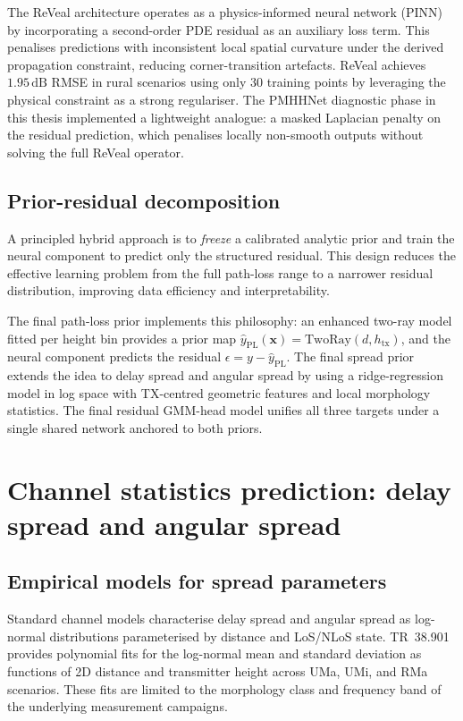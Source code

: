 The ReVeal architecture \cite{reveal2025} operates as a physics-informed neural
network (PINN) by incorporating a second-order PDE residual as an auxiliary loss
term.  This penalises predictions with inconsistent local spatial curvature
under the derived propagation constraint, reducing corner-transition artefacts.
ReVeal achieves~$1.95\,\mathrm{dB}$ RMSE in rural scenarios using only 30
training points by leveraging the physical constraint as a strong regulariser.
The PMHHNet diagnostic phase in this thesis implemented a lightweight analogue:
a masked Laplacian penalty on the residual prediction, which penalises locally
non-smooth outputs without solving the full ReVeal operator.

\subsection{Prior-residual decomposition}

A principled hybrid approach is to \emph{freeze} a calibrated analytic prior and
train the neural component to predict only the structured residual.  This design
reduces the effective learning problem from the full path-loss range to a
narrower residual distribution, improving data efficiency and interpretability.

The final path-loss prior implements this philosophy: an enhanced two-ray model fitted
per height bin provides a prior map
$\hat{y}_{\mathrm{PL}}(\textbf{x}) = \mathrm{TwoRay}(d, h_{\mathrm{tx}})$,
and the neural component predicts the residual
$\epsilon = y - \hat{y}_{\mathrm{PL}}$. The final spread prior extends the idea to delay spread
and angular spread by using a ridge-regression model in log space with
TX-centred geometric features and local morphology statistics. The final
residual GMM-head model unifies all three targets under a single shared network anchored
to both priors.

\section{Channel statistics prediction: delay spread and angular spread}
\label{sec:soa_stats}

\subsection{Empirical models for spread parameters}

Standard channel models characterise delay spread and angular spread as
log-normal distributions parameterised by distance and LoS/NLoS state.
TR~38.901 \cite{tr38901} provides polynomial fits for the log-normal mean and
standard deviation as functions of 2D distance and transmitter height across UMa,
UMi, and RMa scenarios.  These fits are limited to the morphology class and
frequency band of the underlying measurement campaigns.


